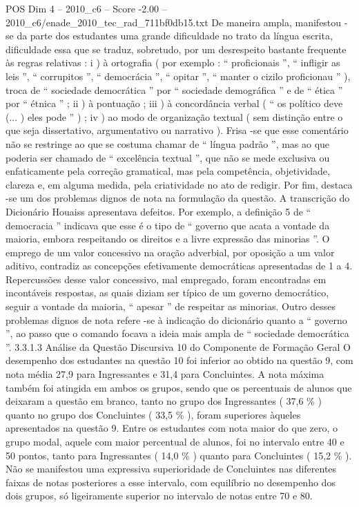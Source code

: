 \begin{textsample}{POS Dim 4 – 2010\_c6 – Score -2.00 – 2010\_c6/enade\_2010\_tec\_rad\_711bf0db15.txt}
De maneira ampla, manifestou -se da parte dos estudantes uma grande dificuldade no trato da língua escrita, dificuldade essa que se traduz, sobretudo, por um desrespeito bastante frequente às regras relativas : i ) à ortografia ( por exemplo : “ proficionais ”, “ infligir as leis ”, “ corrupitos ”, “ democrácia ”, “ opitar ”, “ manter o cizilo proficionau ” ), troca de “ sociedade democrática ” por “ sociedade demográfica ” e de “ ética ” por “ étnica ” ; ii ) à pontuação ; iii ) à concordância verbal ( “ os político deve (... ) eles pode ” ) ; iv ) ao modo de organização textual ( sem distinção entre o que seja dissertativo, argumentativo ou narrativo ).
Frisa -se que esse comentário não se restringe ao que se costuma chamar de “ língua padrão ”, mas ao que poderia ser chamado de “ excelência textual ”, que não se mede exclusiva ou enfaticamente pela correção gramatical, mas pela competência, objetividade, clareza e, em alguma medida, pela criatividade no ato de redigir.
Por fim, destaca -se um dos problemas dignos de nota na formulação da questão.
A transcrição do Dicionário Houaiss apresentava defeitos.
Por exemplo, a definição 5 de “ democracia ” indicava que esse é o tipo de “ governo que acata a vontade da maioria, embora respeitando os direitos e a livre expressão das minorias ”.
O emprego de um valor concessivo na oração adverbial, por oposição a um valor aditivo, contradiz as concepções efetivamente democráticas apresentadas de 1 a 4.
Repercussões desse valor concessivo, mal empregado, foram encontradas em incontáveis respostas, as quais diziam ser típico de um governo democrático, seguir a vontade da maioria, “ apesar ” de respeitar as minorias.
Outro desses problemas dignos de nota refere -se à indicação do dicionário quanto a “ governo ”, ao passo que o comando focava a ideia mais ampla de “ sociedade democrática ”. 3.3.1.3 Análise da Questão Discursiva 10 do Componente de Formação Geral O desempenho dos estudantes na questão 10 foi inferior ao obtido na questão 9, com nota média 27,9 para Ingressantes e 31,4 para Concluintes.
A nota máxima também foi atingida em ambos os grupos, sendo que os percentuais de alunos que deixaram a questão em branco, tanto no grupo dos Ingressantes ( 37,6 \% ) quanto no grupo dos Concluintes ( 33,5 \% ), foram superiores àqueles apresentados na questão 9.
Entre os estudantes com nota maior do que zero, o grupo modal, aquele com maior percentual de alunos, foi no intervalo entre 40 e 50 pontos, tanto para Ingressantes ( 14,0 \% ) quanto para Concluintes ( 15,2 \% ).
Não se manifestou uma expressiva superioridade de Concluintes nas diferentes faixas de notas posteriores a esse intervalo, com equilíbrio no desempenho dos dois grupos, só ligeiramente superior no intervalo de notas entre 70 e 80.

\end{textsample}
